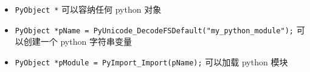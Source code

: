 

\begin{itemize}
\item \verb`PyObject *` 可以容纳任何 python 对象
\item \verb`PyObject *pName = PyUnicode_DecodeFSDefault("my_python_module");` 可以创建一个 python 字符串变量
\item \verb`PyObject *pModule = PyImport_Import(pName);` 可以加载 python 模块
\end{itemize}
